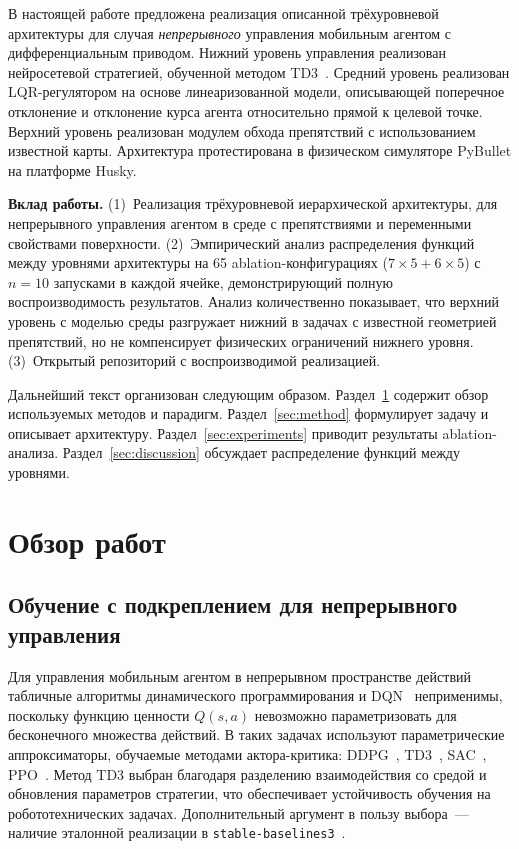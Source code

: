 \documentclass[11pt]{article}
\begin{document}
В настоящей работе предложена реализация описанной трёхуровневой
архитектуры для случая \emph{непрерывного} управления мобильным агентом с дифференциальным приводом.
Нижний уровень управления реализован нейросетевой стратегией, обученной методом TD3~\cite{fujimoto2018td3}. Средний уровень реализован LQR-регулятором на основе линеаризованной модели, описывающей поперечное отклонение и отклонение курса агента относительно прямой к целевой точке. Верхний уровень реализован модулем обхода препятствий с использованием известной карты. Архитектура протестирована в физическом
симуляторе PyBullet на платформе Husky.

\textbf{Вклад работы.} (1)~Реализация трёхуровневой иерархической архитектуры,
для непрерывного управления агентом в среде с препятствиями и переменными свойствами поверхности.
(2)~Эмпирический анализ распределения функций между уровнями архитектуры на 65 ablation-конфигурациях ($7 \times 5 + 6 \times 5$) с $n = 10$ запусками в каждой ячейке, демонстрирующий полную воспроизводимость результатов. Анализ количественно показывает, что верхний
уровень с моделью среды разгружает нижний в задачах с известной
геометрией препятствий, но не компенсирует физических ограничений нижнего
уровня. (3)~Открытый репозиторий с воспроизводимой реализацией.

Дальнейший текст организован следующим образом. Раздел~\ref{sec:related}
содержит обзор используемых методов и парадигм. Раздел~\ref{sec:method}
формулирует задачу и описывает архитектуру. Раздел~\ref{sec:experiments}
приводит результаты ablation-анализа. Раздел~\ref{sec:discussion}
обсуждает распределение функций между уровнями.


\section{Обзор работ}
\label{sec:related}

\subsection{Обучение с подкреплением для непрерывного управления}
\label{sec:rw_rl}

Для управления мобильным агентом в непрерывном пространстве действий
табличные алгоритмы динамического программирования и DQN~\cite{mnih2015dqn} неприменимы, поскольку функцию ценности $Q(s, a)$ невозможно параметризовать для бесконечного множества действий. В таких задачах используют параметрические
аппроксиматоры, обучаемые методами актора-критика: DDPG~\cite{lillicrap2016ddpg}, TD3~\cite{fujimoto2018td3}, SAC~\cite{haarnoja2018sac}, PPO~\cite{schulman2017ppo}. Метод TD3 выбран благодаря разделению взаимодействия со средой и обновления параметров стратегии, что обеспечивает устойчивость обучения на робототехнических задачах. Дополнительный аргумент в пользу выбора~--- наличие эталонной реализации в \verb|stable-baselines3|~\cite{raffin2021sb3}.
\end{document}
